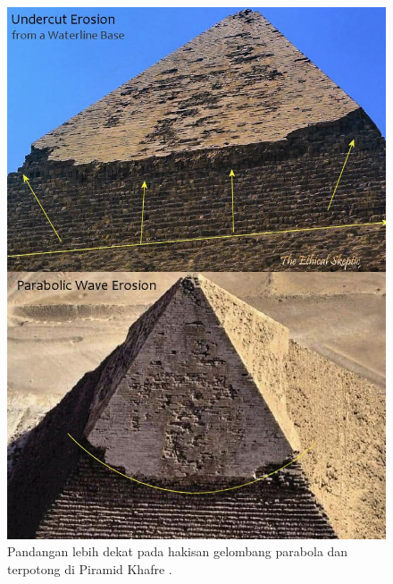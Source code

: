 \documentclass[10pt,twocolumn,letterpaper]{article}
\begin{document}
\begin{figure}[H]
\begin{center}
   \includegraphics[width=1\linewidth]{wave.jpg}
\end{center}
   \caption{Pandangan lebih dekat pada hakisan gelombang parabola dan terpotong di Piramid Khafre \cite{27}.}
\label{fig:19}
\label{fig:onecol}
\end{figure}
\end{document}
